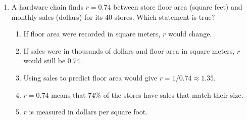 \documentclass[12pt]{article}
\begin{document}
\begin{enumerate}[leftmargin=1.9em, itemsep=0.13in]
        Which is the best description of the association?\hfill{}\rule[-0.2in]{0pt}{0.48in}
        \begin{enumerate}[label=\textbf{(\Alph*)}, leftmargin=2.2em, itemsep=2pt]
          \item Strong, positive, and linear, with no unusual points.
          \item Strong, negative, and linear, with no unusual points.
          \item Strong, negative, and linear, with one site far below the pattern.
          \item Weak and curved, because one site does not follow the others.
          \item There is no association, because one site has low temperature and low
                oxygen.
        \end{enumerate}

  \boxguard[9]%
  \item A hardware chain finds $r = 0.74$ between store floor area (square feet) and monthly
        sales (dollars) for its 40 stores. Which statement is true?
        \begin{enumerate}[label=\textbf{(\Alph*)}, leftmargin=2.2em, itemsep=2pt]
          \item If floor area were recorded in square meters, $r$ would change.
          \item If sales were in thousands of dollars and floor area in square meters, $r$
                would still be 0.74.
          \item Using sales to predict floor area would give $r = 1/0.74 \approx 1.35$.
          \item $r = 0.74$ means that 74\% of the stores have sales that match their size.
          \item $r$ is measured in dollars per square foot.\hfill{}\rule[-0.2in]{0pt}{0.48in}
        \end{enumerate}


\end{enumerate}
\end{document}
